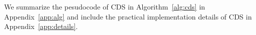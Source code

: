 We summarize the pesudocode of CDS in Algorithm~\ref{alg:cds} in Appendix~\ref{app:alg} and include the practical implementation details of CDS in Appendix~\ref{app:details}.




